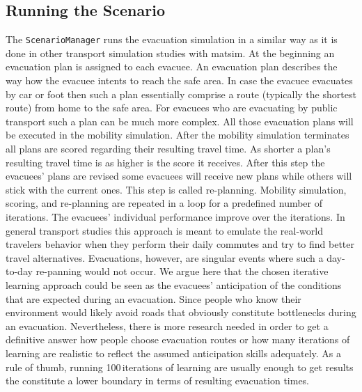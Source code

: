 \subsection{Running the Scenario}
The \lstinline|ScenarioManager| runs the evacuation simulation in a similar way as it is done in other transport simulation studies with \gls{matsim}. 
At the beginning an evacuation plan is assigned to each evacuee. 
An evacuation plan describes the way how the evacuee intents to reach the safe area.
In case the evacuee evacuates by car or foot then such a plan essentially comprise a route (typically the shortest route) from home to the safe area. For evacuees who are evacuating by public transport such a plan can be much more complex. All those evacuation plans will be executed in the mobility simulation. After the mobility simulation terminates all plans are scored regarding their resulting travel time. 
As shorter a plan's resulting travel time is as higher is the score it receives. After this step the evacuees' plans are revised some evacuees will receive new plans while others will stick with the current ones. This step is called re-planning. Mobility simulation, scoring, and re-planning are repeated in a loop for a predefined number of iterations. The evacuees' individual performance improve over the iterations. 
In general transport studies this approach is meant to emulate the real-world travelers behavior when they perform their daily commutes and try to find better travel alternatives. Evacuations, however, are singular events where such a day-to-day re-panning would not occur. We argue here that the chosen iterative learning approach could be seen as the evacuees' anticipation of the conditions that are expected during an evacuation. 
Since people who know their  environment would likely avoid roads that obviously constitute bottlenecks during an evacuation. Nevertheless, there is more research needed in order to get a definitive answer how people choose evacuation routes or how many iterations of learning are realistic to reflect the assumed anticipation skills adequately. As a rule of thumb, running 100\,iterations of learning are usually enough to get results the constitute a lower boundary in terms of resulting evacuation times.

